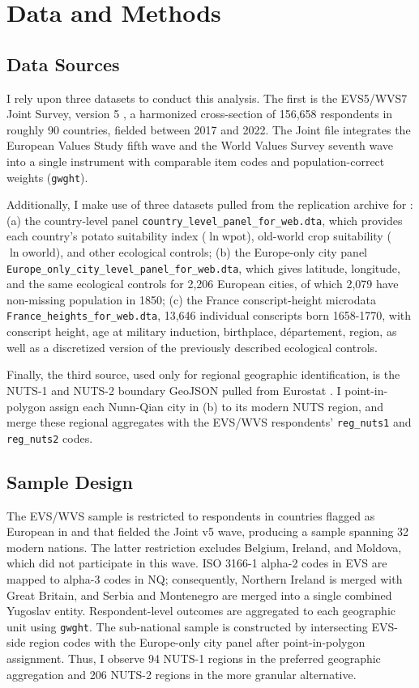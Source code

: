 \documentclass[11pt]{article}
\begin{document}
\section{Data and Methods}
\subsection{Data Sources}
I rely upon three datasets to conduct this analysis. The first is the EVS5/WVS7 Joint Survey, version 5 \citep{EVSWVSJointV5}, a harmonized cross-section of 156{,}658 respondents in roughly 90 countries, fielded between 2017 and 2022. The Joint file integrates the European Values Study fifth wave and the World Values Survey seventh wave into a single instrument with comparable item codes and population-correct weights (\texttt{gwght}).

Additionally, I make use of three datasets pulled from the replication archive for \citet{NunnQian2011}: (a) the country-level panel \texttt{country\_level\_panel\_for\_web.dta}, which provides each country's potato suitability index ($\ln \mathrm{wpot}$), old-world crop suitability ($\ln \mathrm{oworld}$), and other ecological controls; (b) the Europe-only city panel \texttt{Europe\_only\_city\_level\_panel\_for\_web.dta}, which gives latitude, longitude, and the same ecological controls for 2{,}206 European cities, of which 2{,}079 have non-missing population in 1850; (c) the France conscript-height microdata \texttt{France\_heights\_for\_web.dta}, 13{,}646 individual conscripts born 1658-1770, with conscript height, age at military induction, birthplace, département, region, as well as a discretized version of the previously described ecological controls.

Finally, the third source, used only for regional geographic identification, is the NUTS-1 and NUTS-2 boundary GeoJSON pulled from Eurostat \citep{Eurostat_NUTS2021}. I point-in-polygon assign each Nunn-Qian city in (b) to its modern NUTS region, and merge these regional aggregates with the EVS/WVS respondents' \texttt{reg\_nuts1} and \texttt{reg\_nuts2} codes.

\subsection{Sample Design}
The EVS/WVS sample is restricted to respondents in countries flagged as European in \citet{NunnQian2011} and that fielded the Joint v5 wave, producing a sample spanning 32 modern nations. The latter restriction excludes Belgium, Ireland, and Moldova, which did not participate in this wave. ISO 3166-1 alpha-2 codes in EVS are mapped to alpha-3 codes in NQ; consequently, Northern Ireland is merged with Great Britain, and Serbia and Montenegro are merged into a single combined Yugoslav entity. Respondent-level outcomes are aggregated to each geographic unit using \texttt{gwght}. The sub-national sample is constructed by intersecting EVS-side region codes with the Europe-only city panel after point-in-polygon assignment. Thus, I observe 94 NUTS-1 regions in the preferred geographic aggregation and 206 NUTS-2 regions in the more granular alternative.
\end{document}
